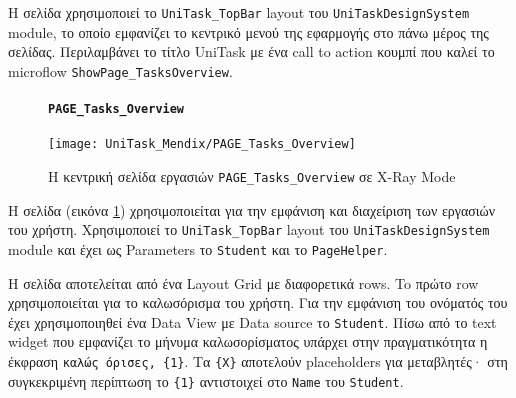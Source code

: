                 Η σελίδα χρησιμοποιεί το \texttt{UniTask\_TopBar} layout του \texttt{UniTaskDesignSystem} module, το οποίο εμφανίζει το κεντρικό μενού της εφαρμογής στο πάνω μέρος της σελίδας. Περιλαμβάνει το τίτλο {\ZonaSB UniTask} με ένα call to action κουμπί που καλεί το microflow \texttt{ShowPage\_TasksOverview}.

                \begin{figure}[H] \noindent
                    \paragraph{\texttt{PAGE\_Tasks\_Overview}}
                    \begin{center}
                        \texttt{[image: UniTask\_Mendix/PAGE\_Tasks\_Overview]}
                        \caption{\centering Η κεντρική σελίδα εργασιών \texttt{PAGE\_Tasks\_Overview} σε X-Ray Mode}
                        \label{fig:unitask_PAGE_Tasks_Overview}
                    \end{center}
                \end{figure}

                Η σελίδα (εικόνα \ref{fig:unitask_PAGE_Tasks_Overview}) χρησιμοποιείται για την εμφάνιση και διαχείριση των εργασιών του χρήστη. Χρησιμοποιεί το \texttt{UniTask\_TopBar} layout του \texttt{UniTaskDesignSystem} module και έχει ως Parameters το \texttt{Student} και το \texttt{PageHelper}.

                Η σελίδα αποτελείται από ένα Layout Grid με διαφορετικά rows. To πρώτο row χρησιμοποιείται για το καλωσόρισμα του χρήστη. Για την εμφάνιση του ονόματός του έχει χρησιμοποιηθεί ένα Data View με Data source το \texttt{Student}. Πίσω από το text widget που εμφανίζει το μήνυμα καλωσορίσματος υπάρχει στην πραγματικότητα η έκφραση \verb|καλώς όρισες, {1}|. Τα \verb|{X}| αποτελούν placeholders για μεταβλητές· στη συγκεκριμένη περίπτωση το \verb|{1}| αντιστοιχεί στο \texttt{Name} του \texttt{Student}.

